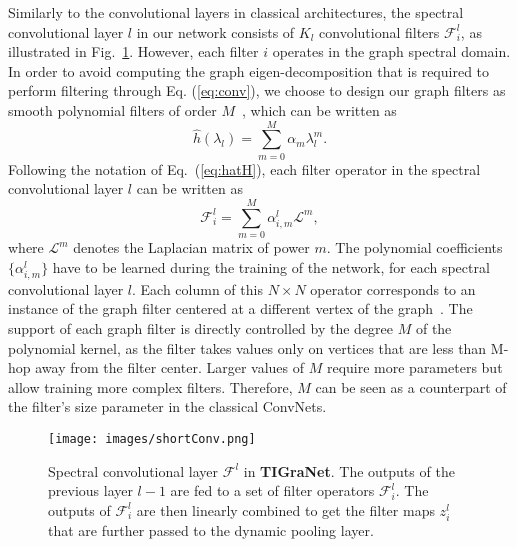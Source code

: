 \documentclass[10pt,journal,compsoc]{IEEEtran}
\begin{document}
	Similarly to the convolutional layers in classical architectures, the spectral convolutional layer $l$ in our network consists of $K_l$ convolutional filters $\mathcal{F}_i^{l}$, as illustrated in Fig.~\ref{fig:conv}. However, each filter $i$ operates in the graph spectral domain. In order to avoid computing the graph eigen-decomposition that is required to perform filtering through Eq. (\ref{eq:conv}), we choose to design our graph filters as smooth polynomial filters of order $M$~\cite{bb:thanou2014learning}, which can be written as
	\begin{equation}
	\hat{h}(\lambda_l) = \sum_{m=0}^M \alpha_m \lambda_l^m .
	\end{equation}
	Following the notation of Eq.~(\ref{eq:hatH}), each filter operator in the spectral convolutional layer $l$ can be written as
	\begin{equation}
	\mathcal{F}_i^{l} = \sum_{m=0}^M \alpha_{i,m}^{l} \mathcal{L}^m ,
	\label{eq:pol_filt_1}
	\end{equation}
	\noindent
	where $\mathcal{L}^m$ denotes the Laplacian matrix of power $m$. The polynomial coefficients $\{\alpha_{i,m}^{l}\}$ have to be learned during the training of the network, for each spectral convolutional layer $l$. Each column of this $N \times N$ operator corresponds to an instance of the graph filter centered at a different vertex of the graph~\cite{bb:thanou2014learning}. The support of each graph filter is directly controlled by the degree $M$ of the polynomial kernel, as the filter takes values only on vertices that are less than M-hop away from the filter center. Larger values of $M$ require more parameters but allow training more complex filters. Therefore, $M$ can be seen as a counterpart of the filter's size parameter in the classical ConvNets.
	
	\begin{figure}[t!]
		\texttt{[image: images/shortConv.png]}
		\caption{Spectral convolutional layer $\mathcal{F}^{l}$ in {\bf TIGraNet}. The outputs of the previous layer $l-1$ are fed to a set of filter operators $\mathcal{F}_i^{l}$. The outputs of $\mathcal{F}_i^{l}$ are then linearly combined to get the filter maps $z_i^{l}$ that are further passed to the dynamic pooling layer.}
		\label{fig:conv}
	\end{figure}
	
\end{document}

